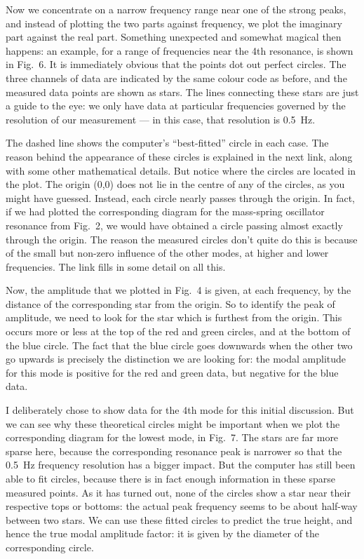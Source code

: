   Now we concentrate on a narrow frequency range near one of the strong peaks, 
  and instead of plotting the two parts against frequency, we plot the 
  imaginary part against the real part. Something unexpected and somewhat 
  magical then happens: an example, for a range of frequencies near the 4th 
  resonance, is shown in Fig.\ 6. It is immediately obvious that the points dot 
  out perfect circles. The three channels of data are indicated by the same 
  colour code as before, and the measured data points are shown as stars. The 
  lines connecting these stars are just a guide to the eye: we only have data 
  at particular frequencies governed by the resolution of our measurement — in 
  this case, that resolution is 0.5~Hz. 

  The dashed line shows the computer’s “best-fitted” circle in each case. The 
  reason behind the appearance of these circles is explained in the next link, 
  along with some other mathematical details. But notice where the circles are 
  located in the plot. The origin (0,0) does not lie in the centre of any of 
  the circles, as you might have guessed. Instead, each circle nearly passes 
  through the origin. In fact, if we had plotted the corresponding diagram for 
  the mass-spring oscillator resonance from Fig.\ 2, we would have obtained a 
  circle passing almost exactly through the origin. The reason the measured 
  circles don’t quite do this is because of the small but non-zero influence of 
  the other modes, at higher and lower frequencies. The link fills in some 
  detail on all this. 

  Now, the amplitude that we plotted in Fig.\ 4 is given, at each frequency, by 
  the distance of the corresponding star from the origin. So to identify the 
  peak of amplitude, we need to look for the star which is furthest from the 
  origin. This occurs more or less at the top of the red and green circles, and 
  at the bottom of the blue circle. The fact that the blue circle goes 
  downwards when the other two go upwards is precisely the distinction we are 
  looking for: the modal amplitude for this mode is positive for the red and 
  green data, but negative for the blue data. 

  I deliberately chose to show data for the 4th mode for this initial 
  discussion. But we can see why these theoretical circles might be important 
  when we plot the corresponding diagram for the lowest mode, in Fig.\ 7. The 
  stars are far more sparse here, because the corresponding resonance peak is 
  narrower so that the 0.5~Hz frequency resolution has a bigger impact. But the 
  computer has still been able to fit circles, because there is in fact enough 
  information in these sparse measured points. As it has turned out, none of 
  the circles show a star near their respective tops or bottoms: the actual 
  peak frequency seems to be about half-way between two stars. We can use these 
  fitted circles to predict the true height, and hence the true modal amplitude 
  factor: it is given by the diameter of the corresponding circle. 

